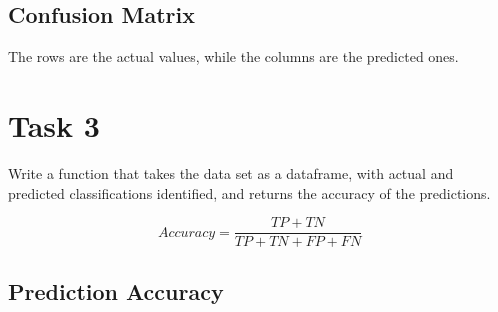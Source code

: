 \documentclass[]{article}
\newenvironment{Shaded}{\begin{snugshade}}{\end{snugshade}}
\newcommand{\KeywordTok}[1]{\textcolor[rgb]{0.13,0.29,0.53}{\textbf{#1}}}
\newcommand{\DataTypeTok}[1]{\textcolor[rgb]{0.13,0.29,0.53}{#1}}
\newcommand{\DecValTok}[1]{\textcolor[rgb]{0.00,0.00,0.81}{#1}}
\newcommand{\StringTok}[1]{\textcolor[rgb]{0.31,0.60,0.02}{#1}}
\newcommand{\OperatorTok}[1]{\textcolor[rgb]{0.81,0.36,0.00}{\textbf{#1}}}
\newcommand{\NormalTok}[1]{#1}
\begin{document}
\subsection{Confusion Matrix}\label{confusion-matrix}

\begin{Shaded}
\end{Shaded}

The rows are the actual values, while the columns are the predicted
ones.

\section{Task 3}\label{task-3}

Write a function that takes the data set as a dataframe, with actual and
predicted classifications identified, and returns the accuracy of the
predictions.

\begin{equation}
Accuracy = \frac{TP + TN}{TP + TN + FP + FN}
\end{equation}

\subsection{Prediction Accuracy}\label{prediction-accuracy}
\end{document}
